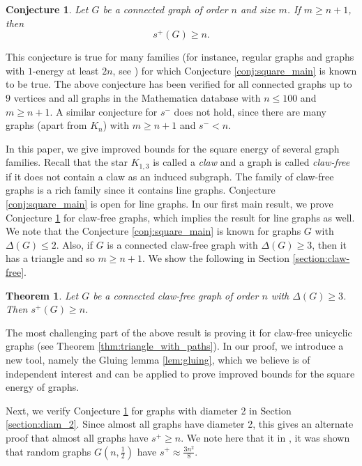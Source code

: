 \documentclass{article}
\newtheorem{theorem}{Theorem}[section]
\newtheorem{conjecture}{Conjecture}[section]
\begin{document}
\begin{conjecture}\label{conj:square_strong}
Let $G$ be a connected graph of order $n$ and size $m$. If $m \geq n+1$, then 
    \[s^+(G) \geq n.\]
\end{conjecture}

This conjecture is true for many families (for instance, regular graphs and graphs with $1$-energy at least $2n$, see \cite{Elphick_FGW_2016}) for which Conjecture \ref{conj:square_main} is known to be true. The above conjecture has been verified for all connected graphs up to $9$ vertices and all graphs in the Mathematica database with $n\le 100$ and $m\ge n+1$. A similar conjecture for $s^-$ does not hold, since there are many graphs (apart from $K_n$) with $m\ge n+1$ and $s^- < n$.

In this paper, we give improved bounds for the square energy of several graph families. Recall that the star $K_{1, 3}$ is called a \emph{claw} and a graph is called \emph{claw-free} if it does not contain a claw as an induced subgraph. The family of claw-free graphs is a rich family since it contains line graphs. Conjecture \ref{conj:square_main} is open for line graphs. In our first main result, we prove Conjecture \ref{conj:square_strong} for claw-free graphs, which implies the result for line graphs as well. We note that the Conjecture \ref{conj:square_main} is known for graphs $G$ with $\Delta(G)\le 2$. Also, if $G$ is a connected claw-free graph with $\Delta(G)\ge 3$, then it has a triangle and so $m\ge n+1$. We show the following in Section \ref{section:claw-free}.

\begin{theorem}\label{thm:claw_free_main} Let $G$ be a connected claw-free graph of order $n$ with $\Delta(G)\ge 3$. Then $s^+(G) \ge n$. 
\end{theorem}

The most challenging part of the above result is proving it for claw-free unicyclic graphs (see Theorem \ref{thm:triangle_with_paths}). In our proof, we introduce a new tool, namely the Gluing lemma \ref{lem:gluing}, which we believe is of independent interest and can be applied to prove improved bounds for the square energy of graphs.  

Next, we verify Conjecture \ref{conj:square_strong} for graphs with diameter 2 in Section \ref{section:diam_2}. Since almost all graphs have diameter 2, this gives an alternate proof that almost all graphs have $s^+\ge n$. We note here that it in \cite{Elphick_FGW_2016}, it was shown that random graphs $G(n,\frac{1}{2})$ have $s^+ \approx \frac{3n^2}{8}$. 
\end{document}

